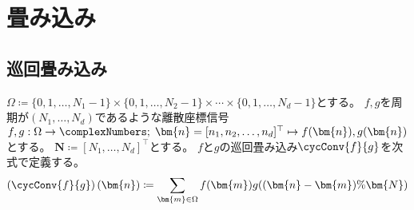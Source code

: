 \part{畳み込み}
		\chapter{巡回畳み込み}
		\label{巡回畳み込み}
		$\Omega \coloneqq \{0,1,\dots,N_1-1\}\times\{0,1,\dots,N_2-1\}\times\cdots\times\{0,1,\dots,N_d-1\}$とする。
		$f,g$を周期が$(N_1,\dots,N_d)$であるような離散座標信号$f,g: \Omega\to\complexNumbers;\;\bm{n} = [n_1,n_2,\dots,n_d]^\top \mapsto f(\bm{n}),g(\bm{n})$とする。
		$\bm{N} \coloneqq [N_1,\dots,N_d]^\top$とする。
		$f$と$g$の巡回畳み込み$\cycConv{f}{g}$を次式で定義する。
		\[ \left(\cycConv{f}{g}\right)(\bm{n}) \coloneqq \sum_{\bm{m} \in\Omega} f(\bm{m})g((\bm{n}-\bm{m})\%\bm{N}) \]

